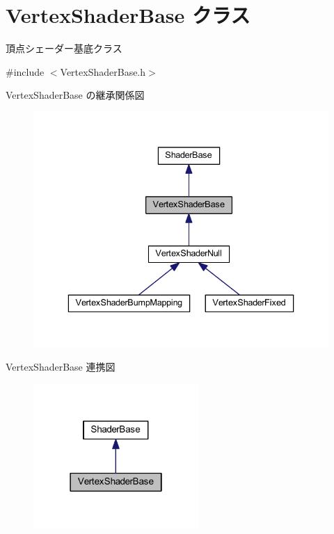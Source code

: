 \hypertarget{class_vertex_shader_base}{}\section{Vertex\+Shader\+Base クラス}
\label{class_vertex_shader_base}


頂点シェーダー基底クラス  




{\ttfamily \#include $<$Vertex\+Shader\+Base.\+h$>$}



Vertex\+Shader\+Base の継承関係図\nopagebreak
\begin{figure}[H]
\begin{center}
\leavevmode
\includegraphics[width=336pt]{class_vertex_shader_base__inherit__graph}
\end{center}
\end{figure}


Vertex\+Shader\+Base 連携図\nopagebreak
\begin{figure}[H]
\begin{center}
\leavevmode
\includegraphics[width=178pt]{class_vertex_shader_base__coll__graph}
\end{center}
\end{figure}
